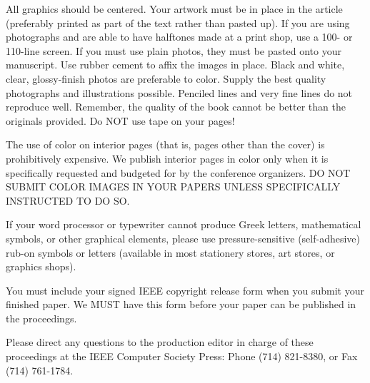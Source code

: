 \documentclass[times, 10pt,twocolumn]{article}
\begin{document}

All graphics should be centered. Your artwork must be in place in the
article (preferably printed as part of the text rather than pasted up).
If you are using photographs and are able to have halftones made at a
print shop, use a 100- or 110-line screen. If you must use plain photos,
they must be pasted onto your manuscript. Use rubber cement to affix the
images in place. Black and white, clear, glossy-finish photos are
preferable to color. Supply the best quality photographs and illustrations
possible. Penciled lines and very fine lines do not reproduce well.
Remember, the quality of the book cannot be better than the originals
provided. Do NOT use tape on your pages!


The use of color on interior pages (that is, pages other than the cover)
is prohibitively expensive. We publish interior pages in color only when
it is specifically requested and budgeted for by the conference
organizers. DO NOT SUBMIT COLOR IMAGES IN YOUR PAPERS UNLESS SPECIFICALLY
INSTRUCTED TO DO SO.


If your word processor or typewriter cannot produce Greek letters,
mathematical symbols, or other graphical elements, please use
pressure-sensitive (self-adhesive) rub-on symbols or letters (available in
most stationery stores, art stores, or graphics shops).


You must include your signed IEEE copyright release form when you submit
your finished paper. We MUST have this form before your paper can be
published in the proceedings.


Please direct any questions to the production editor in charge of these
proceedings at the IEEE Computer Society Press: Phone (714) 821-8380, or
Fax (714) 761-1784.

\nocite{ex1,ex2}  
\end{document}
